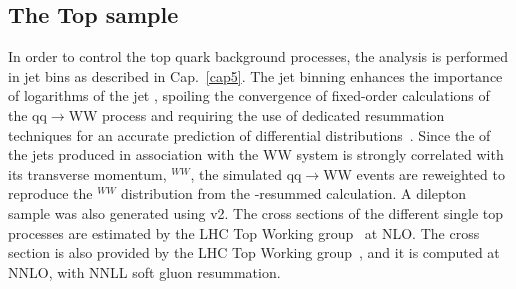 \subsection*{The Top sample}
In order to control the top quark background processes, the analysis is
performed in jet bins as described in Cap.~\ref{cap5}. The jet binning enhances the importance of logarithms of the jet \pt, spoiling the convergence of 
fixed-order calculations of the qq$\rightarrow$WW process and requiring the use of dedicated resummation techniques for an
accurate prediction of differential distributions~\cite{Meade:2014fca,Jaiswal:2014yba}.  
Since the \pt of the jets produced in association with the WW system is strongly correlated with its transverse momentum, 
\pt$^{WW}$,  the simulated qq$\rightarrow$WW events are reweighted  
to reproduce the \pt$^{WW}$ distribution from the \pt-resummed calculation.
A \ttbar  dilepton sample was also generated using \POWHEG v2. 
The cross sections of the different single top processes are estimated by the LHC Top Working group~\cite{singletop} at NLO.
The \ttbar cross section is also provided by the LHC Top Working group~\cite{topxsec}, and it is computed at NNLO, with NNLL soft gluon resummation. 


